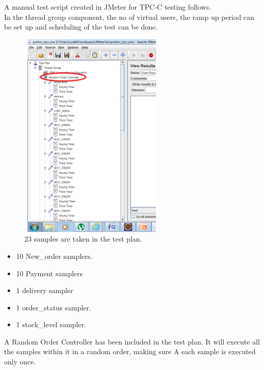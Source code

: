 \documentclass[12pt]{book}
\begin{document}
  A manual test script created in JMeter for TPC-C testing follows.\\

  In the thread group component, the no of virtual users, the ramp up period can be set up and scheduling of the test can be done. \\
  
  \begin{figure}[H]
    \centering
    \includegraphics[width=7cm, height=10cm]{images/ntpcc_86}
    \caption{23 samples are taken in the test plan. \label{fig:fig70_JMeter}}
  \end{figure} 

  \begin{itemize}
   \item 10 New\_order samplers. 
   \item 10 Payment samplers 
   \item 1 delivery sampler 
   \item 1 order\_status sampler. 
   \item 1 stock\_level sampler. 
  \end{itemize}

  A Random Order Controller has been included in the test plan. It will execute all the samples within it in a random order, making sure
  A  each sample is executed only once.\\
  
\end{document}
